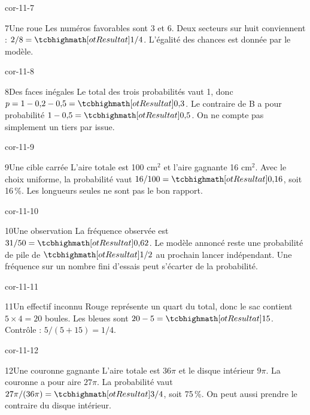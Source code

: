 \begin{blocLivre}{cor-11-7}\begin{corrige}{7}{Une roue}
Les numéros favorables sont 3 et 6. Deux secteurs sur huit conviennent : $2/8=\res{1/4}$. L’égalité des chances est donnée par le modèle.
\label{fig-cor-11-7}
\end{corrige}\end{blocLivre}
\begin{blocLivre}{cor-11-8}\begin{corrige}{8}{Des faces inégales}
Le total des trois probabilités vaut 1, donc $p=1-0{,}2-0{,}5=\res{0{,}3}$. Le contraire de B a pour probabilité $1-0{,}5=\res{0{,}5}$. On ne compte pas simplement un tiers par issue.
\end{corrige}\end{blocLivre}
\begin{blocLivre}{cor-11-9}\begin{corrige}{9}{Une cible carrée}
L’aire totale est 100 cm$^2$ et l’aire gagnante 16 cm$^2$. Avec le choix uniforme, la probabilité vaut $16/100=\res{0{,}16}$, soit 16\,\%. Les longueurs seules ne sont pas le bon rapport.
\label{fig-cor-11-9}
\end{corrige}\end{blocLivre}
\begin{blocLivre}{cor-11-10}\begin{corrige}{10}{Une observation}
La fréquence observée est $31/50=\res{0{,}62}$. Le modèle annoncé reste une probabilité de pile de $\res{1/2}$ au prochain lancer indépendant. Une fréquence sur un nombre fini d’essais peut s’écarter de la probabilité.
\end{corrige}\end{blocLivre}
\begin{blocLivre}{cor-11-11}\begin{corrige}{11}{Un effectif inconnu}
Rouge représente un quart du total, donc le sac contient $5\times4=20$ boules. Les bleues sont $20-5=\res{15}$. Contrôle : $5/(5+15)=1/4$.
\end{corrige}\end{blocLivre}
\begin{blocLivre}{cor-11-12}\begin{corrige}{12}{Une couronne gagnante}
L’aire totale est $36\pi$ et le disque intérieur $9\pi$. La couronne a pour aire $27\pi$. La probabilité vaut $27\pi/(36\pi)=\res{3/4}$, soit 75\,\%. On peut aussi prendre le contraire du disque intérieur.
\label{fig-cor-11-12}
\end{corrige}\end{blocLivre}
